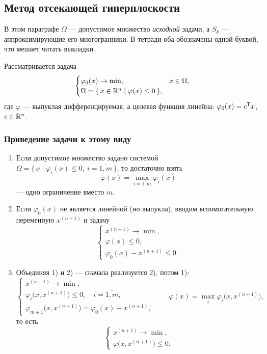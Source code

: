 
\subsection{Метод отсекающей гиперплоскости}
\label{subsec:cutting-plane}

\begin{idea}[title={Обозначения}]
В этом параграфе $\Omega$ — допустимое множество \emph{исходной} задачи,
а $S_k$ — аппроксимирующие его многогранники. В тетради оба обозначены одной
буквой, что мешает читать выкладки.
\end{idea}

Рассматривается задача
\[
  \begin{cases}
    \varphi_0(x) \to \min , & x \in \Omega , \\
    \Omega = \{\, x \in \mathbb{R}^n \mid \varphi(x) \le 0 \,\} ,
  \end{cases}
\]
где $\varphi$ — выпуклая дифференцируемая, а целевая функция линейна:
$\varphi_0(x) = c^{\mathsf{T}} x$, $c \in \mathbb{R}^n$.

\subsubsection*{Приведение задачи к этому виду}

\begin{enumerate}[label=\arabic*),left=0pt]
  \item Если допустимое множество задано системой
        $\Omega = \{\, x \mid \varphi_i(x) \le 0,\ i = \overline{1,m} \,\}$,
        то достаточно взять
        \[
          \varphi(x) = \max_{i = \overline{1,m}} \varphi_i(x)
        \]
        — одно ограничение вместо $m$.
  \item Если $\varphi_0(x)$ не является линейной (но выпукла), вводим
        вспомогательную переменную $x^{(n+1)}$ и задачу
        \[
          \begin{cases}
            x^{(n+1)} \to \min , \\
            \varphi(x) \le 0 , \\
            \varphi_0(x) - x^{(n+1)} \le 0 .
          \end{cases}
        \]
  \item Объединяя 1) и 2) — сначала реализуется 2), потом 1):
        \[
          \begin{cases}
            x^{(n+1)} \to \min , \\
            \varphi_i\big(x, x^{(n+1)}\big) \le 0 , \quad i = \overline{1,m} , \\
            \varphi_{m+1}\big(x, x^{(n+1)}\big) = \varphi_0(x) - x^{(n+1)} ,
          \end{cases}
          \qquad
          \varphi(x) = \max_{i} \varphi_i\big(x, x^{(n+1)}\big) ,
        \]
        то есть
        \[
          \begin{cases}
            x^{(n+1)} \to \min , \\
            \varphi\big(x, x^{(n+1)}\big) \le 0 .
          \end{cases}
        \]
\end{enumerate}

